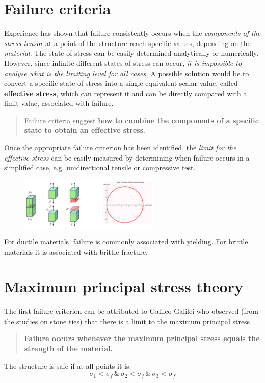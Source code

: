 \documentclass[class=report, crop=false, 12pt,a4paper]{standalone}
\begin{document}
\section{Failure criteria}
Experience has shown that failure consistently occurs when the \textit{components of the stress tensor} at a point of the structure reach specific values, depending on the \textit{material}. The state of stress can be easily determined analytically or numerically. However, since infinite different states of stress can occur, \textit{it is impossible to analyse what is the limiting level for all cases.} A possible solution would be to convert a specific state of stress into a single equivalent scalar value, called \textbf{effective stress}, which can represent it and can be  directly compared with a limit value, associated with failure.
\begin{quotation}
  Failure criteria suggest \textbf{how to combine the components of a specific state to obtain an effective stress}.
\end{quotation}
Once the appropriate failure criterion has been identified, the \textit{limit for the effective stress} can be easily measured by determining when failure occurs in a simplified case, e.g. unidirectional tensile or compressive test.
\begin{figure}[H]
  \centering
  \includegraphics[width = 0.6\textwidth]{../img/diagram14.png}
  \caption{}
\end{figure}
For ductile materials, failure is commonly associated with yielding. For brittle materials it is associated with brittle fracture. 
\section{Maximum principal stress theory}
The first failure criterion can be attributed to Galileo Galilei who observed (from the studies on stone ties) that there is a limit to the maximum principal stress. 
\begin{quotation}
  \textbf{Failure occurs whenever the maximum principal stress equals the strength of the material.}
\end{quotation}
The structure is safe if at all points it is:
\begin{equation}
  \sigma_1 < \sigma_f \, \& \, \sigma_2 < \sigma_f \, \& \, \sigma_3 < \sigma_f
\end{equation}
\end{document}
